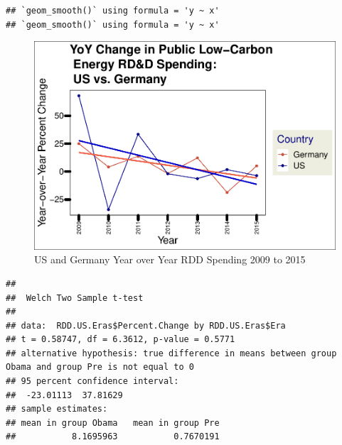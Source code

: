 \documentclass[
  12pt,
]{article}
\newenvironment{Shaded}{\begin{snugshade}}{\end{snugshade}}
\newcommand{\CommentTok}[1]{\textcolor[rgb]{0.56,0.35,0.01}{\textit{#1}}}
\newcommand{\FunctionTok}[1]{\textcolor[rgb]{0.00,0.00,0.00}{#1}}
\newcommand{\NormalTok}[1]{#1}
\newcommand{\OtherTok}[1]{\textcolor[rgb]{0.56,0.35,0.01}{#1}}
\newcommand{\SpecialCharTok}[1]{\textcolor[rgb]{0.00,0.00,0.00}{#1}}
\begin{document}
\begin{verbatim}
## `geom_smooth()` using formula = 'y ~ x'
## `geom_smooth()` using formula = 'y ~ x'
\end{verbatim}

\begin{figure}
\centering
\includegraphics{Chang_Jenkins_Mullens_ENV872_Final_files/figure-latex/visualizing Obama US and Germany data together-1.pdf}
\caption{US and Germany Year over Year RDD Spending 2009 to 2015}
\end{figure}

\begin{Shaded}
\end{Shaded}

\begin{verbatim}
## 
##  Welch Two Sample t-test
## 
## data:  RDD.US.Eras$Percent.Change by RDD.US.Eras$Era
## t = 0.58747, df = 6.3612, p-value = 0.5771
## alternative hypothesis: true difference in means between group Obama and group Pre is not equal to 0
## 95 percent confidence interval:
##  -23.01113  37.81629
## sample estimates:
## mean in group Obama   mean in group Pre 
##           8.1695963           0.7670191
\end{verbatim}
\end{document}
